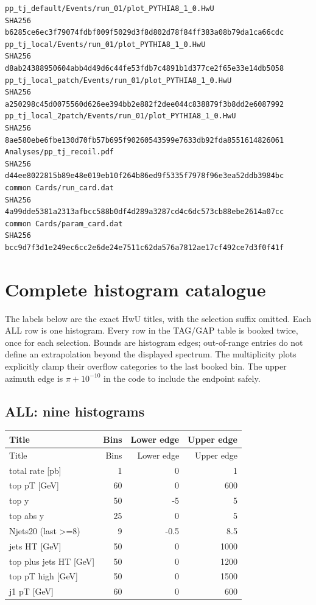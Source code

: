\documentclass[11pt,a4paper]{article}
\begin{document}
\begin{lstlisting}
pp_tj_default/Events/run_01/plot_PYTHIA8_1_0.HwU
SHA256 b6285ce6ec3f79074fdbf009f5029d3f8d802d78f84ff383a08b79da1ca66cdc
pp_tj_local/Events/run_01/plot_PYTHIA8_1_0.HwU
SHA256 d8ab24388950604abb4d49d6c44fe53fdb7c4891b1d377ce2f65e33e14db5058
pp_tj_local_patch/Events/run_01/plot_PYTHIA8_1_0.HwU
SHA256 a250298c45d0075560d626ee394bb2e882f2dee044c838879f3b8dd2e6087992
pp_tj_local_2patch/Events/run_01/plot_PYTHIA8_1_0.HwU
SHA256 8ae580ebe6fbe130d70fb57b695f90260543599e7633db92fda8551614826061
Analyses/pp_tj_recoil.pdf
SHA256 d44ee8022815b89e48e019eb10f264b86ed9f5335f7978f96e3ea52ddb3984bc
common Cards/run_card.dat
SHA256 4a99dde5381a2313afbcc588b0df4d289a3287cd4c6dc573cb88ebe2614a07cc
common Cards/param_card.dat
SHA256 bcc9d7f3d1e249ec6cc2e6de24e7511c62da576a7812ae17cf492ce7d3f0f41f
\end{lstlisting}


\clearpage
\section{Complete histogram catalogue}\label{app:catalogue}

The labels below are the exact HwU titles, with the selection suffix omitted.
Each ALL row is one histogram. Every row in the TAG/GAP table is booked
twice, once for each selection. Bounds are histogram edges; out-of-range
entries do not define an extrapolation beyond the displayed spectrum.
The multiplicity plots explicitly clamp their overflow categories to
the last booked bin. The upper azimuth edge is $\pi+10^{-10}$ in the code
to include the endpoint safely.

\subsection*{ALL: nine histograms}
\begin{longtable}{@{}L{88mm}rrr@{}}
\toprule
Title & Bins & Lower edge & Upper edge\\
\midrule
\endfirsthead
\toprule
Title & Bins & Lower edge & Upper edge\\
\midrule
\endhead
\bottomrule
\endfoot
total rate [pb] & 1 & 0 & 1 \\
top pT [GeV] & 60 & 0 & 600 \\
top y & 50 & -5 & 5 \\
top abs y & 25 & 0 & 5 \\
Njets20 (last >=8) & 9 & -0.5 & 8.5 \\
jets HT [GeV] & 50 & 0 & 1000 \\
top plus jets HT [GeV] & 50 & 0 & 1200 \\
top pT high [GeV] & 50 & 0 & 1500 \\
j1 pT [GeV] & 60 & 0 & 600 \\
\end{longtable}
\end{document}
